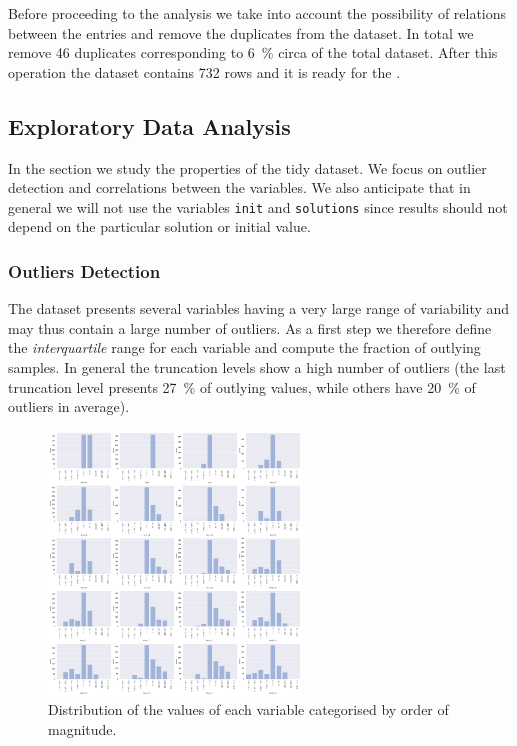 Before proceeding to the analysis we take into account the possibility of relations between the entries and remove the duplicates from the dataset.
In total we remove 46 duplicates corresponding to \SI{6}{\percent} circa of the total dataset.
After this operation the dataset contains 732 rows and it is ready for the \eda.


\subsection{Exploratory Data Analysis}

In the \eda section we study the properties of the tidy dataset.
We focus on outlier detection and correlations between the variables.
We also anticipate that in general we will not use the variables \texttt{init} and \texttt{solutions} since results should not depend on the particular solution or initial value.


\subsubsection{Outliers Detection}

The dataset presents several variables having a very large range of variability and may thus contain a large number of outliers.
As a first step we therefore define the \emph{interquartile} range for each variable and compute the fraction of outlying samples.\footnotemark{}
In general the truncation levels show a high number of outliers (the last truncation level presents \SI{27}{\percent} of outlying values, while others have \SI{20}{\percent} of outliers in average).

\begin{figure}[htbp]
  \centering
  \includegraphics[width=0.6\textwidth]{img/counts_full}
  \caption{Distribution of the values of each variable categorised by order of magnitude.}
  \label{fig:lumps:counts}
\end{figure}

